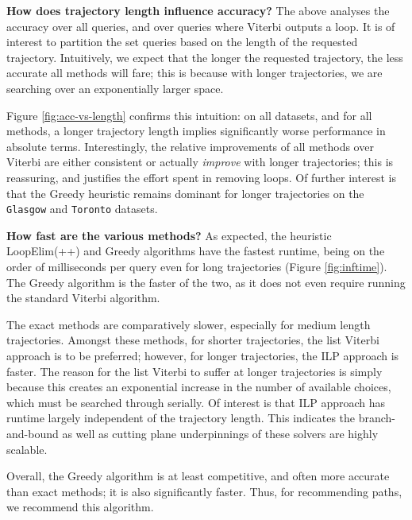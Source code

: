 \textbf{How does trajectory length influence accuracy?}
The above analyses the accuracy over all queries, and over queries where {\sc Viterbi} outputs a loop.
It is of interest to partition the set queries based on the length of the requested trajectory.
Intuitively, we expect that the longer the requested trajectory, the less accurate all methods will fare; this is because with longer trajectories, we are searching over an exponentially larger space.

Figure \ref{fig:acc-vs-length} confirms this intuition:
on all datasets, and for all methods,
a longer trajectory length implies significantly worse performance in absolute terms.
Interestingly, the relative improvements of all methods over {\sc Viterbi} are either consistent or actually \emph{improve} with longer trajectories;
this is reassuring, and justifies the effort spent in removing loops.
Of further interest is that the {\sc Greedy} heuristic remains dominant for longer trajectories on the {\tt Glasgow} and {\tt Toronto} datasets.


\textbf{How fast are the various methods?}
As expected, the heuristic {\sc LoopElim(++)} and {\sc Greedy} algorithms have the fastest runtime, being on the order of milliseconds per query even for long trajectories (Figure \ref{fig:inftime}).
The {\sc Greedy} algorithm is the faster of the two, as it does not even require running the standard Viterbi algorithm.

The exact methods are comparatively slower, especially for medium length trajectories.
Amongst these methods, for shorter trajectories, the list Viterbi approach is to be preferred;
however, for longer trajectories, the ILP approach is faster.
The reason for the list Viterbi to suffer at longer trajectories is simply because this creates an exponential increase in the number of available choices, which must be searched through serially.
Of interest is that ILP approach has runtime largely independent of the trajectory length.
This indicates the branch-and-bound as well as cutting plane underpinnings of these solvers are highly scalable.

Overall, the {\sc Greedy} algorithm is at least competitive, and often more accurate than exact methods;
it is also significantly faster.
Thus, for recommending paths, we recommend this algorithm.


